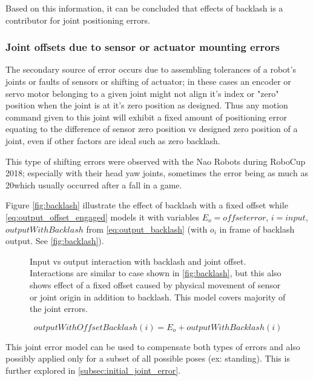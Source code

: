 \documentclass[english, printversion, nomenclature, notitle]{tuvisionthesis} %
\begin{document}
Based on this information, it can be concluded that effects of backlash is a contributor for joint positioning errors.

\subsubsection{Joint offsets due to sensor or actuator mounting errors}

The secondary source of error occurs due to assembling tolerances of a robot's joints or faults of sensors or shifting of actuator; in these cases an encoder or servo motor belonging to a given joint might not align it's index or "zero" position when the joint is at it's zero position as designed. Thus any motion command given to this joint will exhibit a fixed amount of positioning error equating to the difference of sensor zero position vs designed zero position of a joint, even if other factors are ideal such as zero backlash.

This type of shifting errors were observed with the Nao Robots during RoboCup 2018; especially with their head yaw joints, sometimes the error being as much as 20\degree which usually occurred after a fall in a game. 

Figure \ref{fig:backlash} illustrate the effect of backlash with a fixed offset while \cref{eq:output_offset_engaged} models it with variables $E_o = offset error$, $i = input$, $outputWithBacklash$ from \cref{eq:output_backlash} (with $o_i$ in frame of backlash output. See \cref{fig:backlash}).

\begin{figure}
	\def\svgwidth{\linewidth}
	
	\caption{Input vs output interaction with backlash and joint offset. Interactions are similar to case shown in \ref{fig:backlash}, but this also shows effect of a fixed offset caused by physical movement of sensor or joint origin in addition to backlash. This model covers majority of the joint errors.}
	\label{fig:backlash_offset}
\end{figure}

\begin{equation}
outputWithOffsetBacklash(i) = E_o + outputWithBacklash(i)
\label{eq:output_offset_engaged}
\end{equation}

This joint error model can be used to compensate both types of errors and also possibly applied only for a subset of all possible poses (ex: standing). This is further explored in \cref{subsec:initial_joint_error}.
\end{document}
